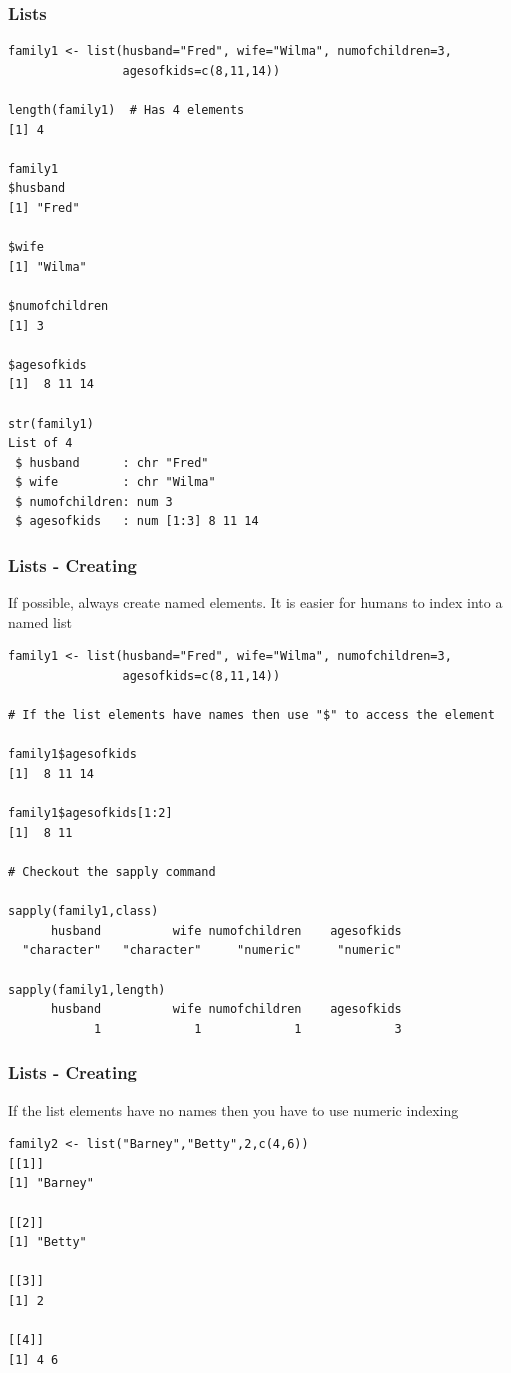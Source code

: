 \documentclass{beamer}
\begin{document}
%
\begin{frame}[fragile]
\frametitle{Lists}
\scriptsize
\begin{verbatim}
family1 <- list(husband="Fred", wife="Wilma", numofchildren=3, 
                agesofkids=c(8,11,14))

length(family1)  # Has 4 elements
[1] 4

family1
$husband
[1] "Fred"

$wife
[1] "Wilma"

$numofchildren
[1] 3

$agesofkids
[1]  8 11 14

str(family1)
List of 4
 $ husband      : chr "Fred"
 $ wife         : chr "Wilma"
 $ numofchildren: num 3
 $ agesofkids   : num [1:3] 8 11 14
\end{verbatim}

\end{frame}

%
%
\begin{frame}[fragile]
\frametitle{Lists - Creating}
If possible, always create named elements. It is easier for humans to index into a named list
\scriptsize
\begin{verbatim}
family1 <- list(husband="Fred", wife="Wilma", numofchildren=3, 
                agesofkids=c(8,11,14))
                
# If the list elements have names then use "$" to access the element

family1$agesofkids   
[1]  8 11 14

family1$agesofkids[1:2]
[1]  8 11

# Checkout the sapply command 

sapply(family1,class)
      husband          wife numofchildren    agesofkids 
  "character"   "character"     "numeric"     "numeric" 

sapply(family1,length)
      husband          wife numofchildren    agesofkids 
            1             1             1             3 
\end{verbatim}
\end{frame}

%
\begin{frame}[fragile]
\frametitle{Lists - Creating}
If the list elements have no names then you have to use numeric indexing
\footnotesize
\begin{verbatim}
family2 <- list("Barney","Betty",2,c(4,6))
[[1]]
[1] "Barney"

[[2]]
[1] "Betty"

[[3]]
[1] 2

[[4]]
[1] 4 6

\end{verbatim}
\end{frame}
\end{document}
